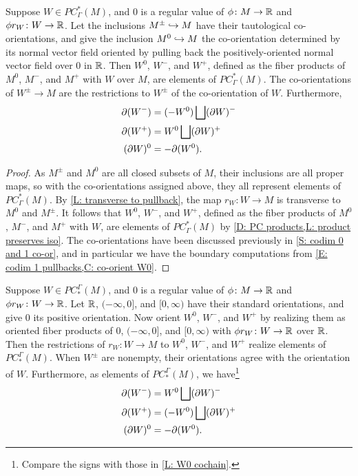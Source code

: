 \begin{lemma}\label{L: W0 cochain}
	Suppose $W \in PC^*_\Gamma(M)$, and $0$ is a regular value of $\phi \colon M \to \mathbb{R}$ and $\phi r_W \colon W \to \mathbb{R}$.
	Let the inclusions $M^\pm \hookrightarrow M$ have their tautological co-orientations, and give the inclusion $M^0 \hookrightarrow M$ the co-orientation determined by its normal vector field oriented by pulling back the positively-oriented normal vector field over $0$ in $\mathbb{R}$.
	Then $W^0$, $W^-$, and $W^+$, defined as the fiber products of $M^0$, $M^-$, and $M^+$ with $W$ over $M$, are elements of $PC^*_\Gamma(M)$.
	The co-orientations of $W^\pm \to M$ are the restrictions to $W^\pm$ of the co-orientation of $W$.
	Furthermore,
	\begin{align*}
		\partial(W^-) &=  (-W^0) \bigsqcup (\partial W)^- \\
		\partial (W^+) &= W^0 \bigsqcup (\partial W)^+\\
		(\partial W)^0 &= -\partial (W^0).
	\end{align*}
\end{lemma}
\begin{proof}
	As $M^\pm$ and $M^0$ are all closed subsets of $M$, their inclusions are all proper maps, so with the co-orientations assigned above, they all represent elements of $PC^*_\Gamma(M)$.
	By \cref{L: transverse to pullback}, the map $r_W \colon W \to M$ is transverse to $M^0$ and $M^\pm$.
	It follows that $W^0$, $W^-$, and $W^+$, defined as the fiber products of $M^0$, $M^-$, and $M^+$ with $W$, are elements of $PC^*_\Gamma(M)$ by \cref{D: PC products,L: product preserves iso}.
	The co-orientations have been discussed previously in \cref{S: codim 0 and 1 co-or}, and in particular we have the boundary computations from \cref{E: codim 1 pullbacks,C: co-orient W0}.
\end{proof}


\begin{lemma}\label{L: W0 chain}
	Suppose $W \in PC_*^\Gamma(M)$, and $0$ is a regular value of $\phi \colon M \to \mathbb{R}$ and $\phi r_W \colon W \to \mathbb{R}$.
	Let $\mathbb{R}$, $(-\infty, 0]$, and $[0,\infty)$ have their standard orientations, and give $0$ its positive orientation.
	Now orient $W^0$, $W^-$, and $W^+$ by realizing them as oriented fiber products of $0$,  $(-\infty, 0]$, and $[0,\infty)$ with $\phi r_W \colon W \to \mathbb{R}$ over $\mathbb{R}$.
	Then the restrictions of $r_W \colon W \to M$ to $W^0$, $W^-$, and $W^+$ realize elements of $PC_*^\Gamma(M)$.
	When $W^\pm$ are nonempty, their orientations agree with the orientation of $W$.
	Furthermore, as elements of $PC_*^\Gamma(M)$, we have\footnote{Compare the signs with those in \cref{L: W0 cochain}.}
	\begin{align*}
	\partial(W^-) &=  W^0 \bigsqcup (\partial W)^- \\
	\partial(W^+) &= (-W^0) \bigsqcup (\partial W)^+\\
	(\partial W)^0 &= -\partial (W^0).
	\end{align*}
\end{lemma}

